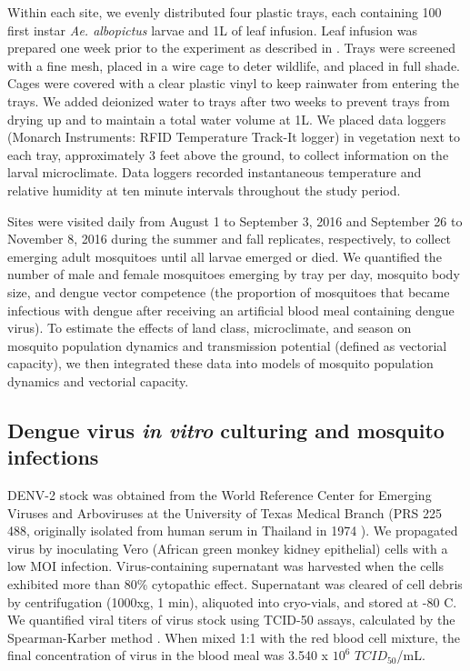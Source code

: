 \documentclass[12pt]{article}
\begin{document}
Within each site, we evenly distributed four plastic trays, each containing 100 first instar \textit{Ae. albopictus} larvae and 1L of leaf infusion. Leaf infusion was prepared one week prior to the experiment as described in \citet{murdock2017}.  Trays were screened with a fine mesh, placed in a wire cage to deter wildlife, and placed in full shade. Cages were covered with a clear plastic vinyl to keep rainwater from entering the trays. We added deionized water to trays after two weeks to prevent trays from drying up and to maintain a total water volume at 1L. We placed data loggers (Monarch Instruments: RFID Temperature Track-It logger) in vegetation next to each tray, approximately 3 feet above the ground, to collect information on the larval microclimate. Data loggers recorded instantaneous temperature and relative humidity at ten minute intervals throughout the study period.

Sites were visited daily from August 1 to September 3, 2016 and September 26 to November 8, 2016 during the summer and fall replicates, respectively, to collect emerging adult mosquitoes until all larvae emerged or died. We quantified the number of male and female mosquitoes emerging by tray per day, mosquito body size, and dengue vector competence (the proportion of mosquitoes that became infectious with dengue after receiving an artificial blood meal containing dengue virus). To estimate the effects of land class, microclimate, and season on mosquito population dynamics and transmission potential (defined as vectorial capacity), we then integrated these data into models of mosquito population dynamics and vectorial capacity.

\subsection{Dengue virus \textit{in vitro} culturing and mosquito infections}
DENV-2 stock was obtained from the World Reference Center for Emerging Viruses and Arboviruses at the University of Texas Medical Branch (PRS 225 488, originally isolated from human serum in Thailand in 1974 \citep{vazeille-falcoz1999}). We propagated virus by inoculating Vero (African green monkey kidney epithelial) cells with a low MOI infection. Virus-containing supernatant was harvested when the cells exhibited more than 80\% cytopathic effect. Supernatant was cleared of cell debris by centrifugation (1000xg, 1 min), aliquoted into cryo-vials, and stored at -80 \degree C. We quantified viral titers of virus stock using TCID-50 assays, calculated by the Spearman-Karber method \citep{shao2016}. When mixed 1:1 with the red blood cell mixture, the final concentration of virus in the blood meal was 3.540 x $10^6$ $TCID_{50}$/mL.
\end{document}
